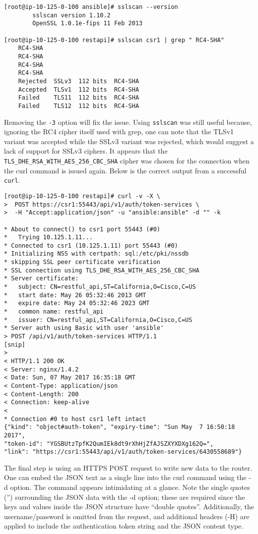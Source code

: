 \begin{verbatim}
[root@ip-10-125-0-100 ansible]# sslscan --version
		sslscan version 1.10.2 
		OpenSSL 1.0.1e-fips 11 Feb 2013

[root@ip-10-125-0-100 restapi]# sslscan csr1 | grep " RC4-SHA"
    RC4-SHA
    RC4-SHA
    RC4-SHA
    RC4-SHA
    Rejected  SSLv3  112 bits  RC4-SHA
    Accepted  TLSv1  112 bits  RC4-SHA
    Failed    TLS11  112 bits  RC4-SHA
    Failed    TLS12  112 bits  RC4-SHA
\end{verbatim}

Removing the \verb|-3| option will fix the issue. Using \verb|sslscan| was still
useful because, ignoring the RC4 cipher itself used with grep, one can note
that the TLSv1 variant was accepted while the SSLv3 variant was rejected,
which would suggest a lack of support for SSLv3 ciphers. It appears that the
\verb|TLS_DHE_RSA_WITH_AES_256_CBC_SHA| cipher was chosen for the connection
when the curl command is issued again. Below is the correct output from a
successful \verb|curl|.

\begin{verbatim}
[root@ip-10-125-0-100 restapi]# curl -v -X \
>  POST https://csr1:55443/api/v1/auth/token-services \
>  -H "Accept:application/json" -u "ansible:ansible" -d "" -k

* About to connect() to csr1 port 55443 (#0)
*   Trying 10.125.1.11...
* Connected to csr1 (10.125.1.11) port 55443 (#0)
* Initializing NSS with certpath: sql:/etc/pki/nssdb
* skipping SSL peer certificate verification
* SSL connection using TLS_DHE_RSA_WITH_AES_256_CBC_SHA
* Server certificate:
* 	subject: CN=restful_api,ST=California,O=Cisco,C=US
* 	start date: May 26 05:32:46 2013 GMT
* 	expire date: May 24 05:32:46 2023 GMT
* 	common name: restful_api
* 	issuer: CN=restful_api,ST=California,O=Cisco,C=US
* Server auth using Basic with user 'ansible'
> POST /api/v1/auth/token-services HTTP/1.1
[snip]
> 
< HTTP/1.1 200 OK
< Server: nginx/1.4.2
< Date: Sun, 07 May 2017 16:35:18 GMT
< Content-Type: application/json
< Content-Length: 200
< Connection: keep-alive
< 
* Connection #0 to host csr1 left intact
{"kind": "object#auth-token", "expiry-time": "Sun May  7 16:50:18 2017",
"token-id": "YGSBUtzTpfK2QumIEk8dt9rXhHjZfAJSZXYXDXg162Q=",
"link": "https://csr1:55443/api/v1/auth/token-services/6430558689"}
\end{verbatim}

The final step is using an HTTPS POST request to write new data to the router.
One can embed the JSON text as a single line into the curl command using the
-d option. The command appears intimidating at a glance. Note the single
quotes ('') surrounding the JSON data with the -d option; these are required
since the keys and values inside the JSON structure have ``double quotes''.
Additionally, the username/password is omitted from the request, and
additional headers (-H) are applied to include the authentication token string
and the JSON content type.

